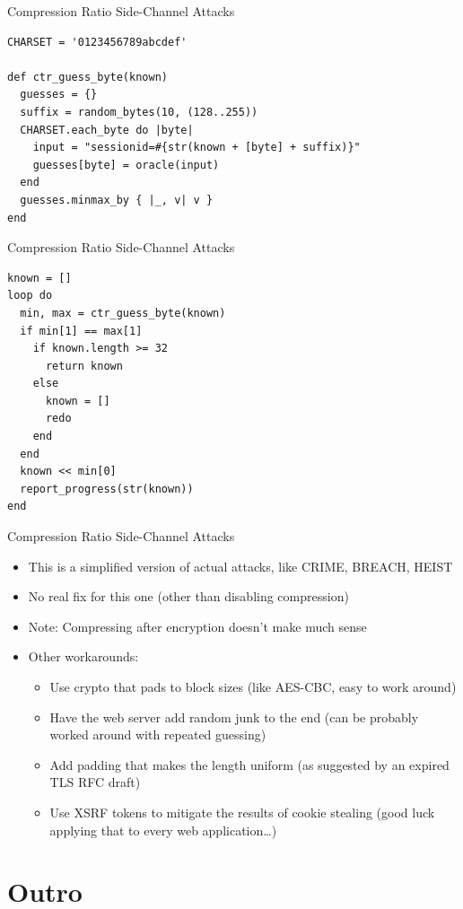 \documentclass[presentation]{beamer}
\begin{document}
\begin{frame}[fragile,label={sec:orga816509}]{Compression Ratio Side-Channel Attacks}
 \begin{verbatim}
CHARSET = '0123456789abcdef'

def ctr_guess_byte(known)
  guesses = {}
  suffix = random_bytes(10, (128..255))
  CHARSET.each_byte do |byte|
    input = "sessionid=#{str(known + [byte] + suffix)}"
    guesses[byte] = oracle(input)
  end
  guesses.minmax_by { |_, v| v }
end
\end{verbatim}
\end{frame}

\begin{frame}[fragile,label={sec:orgc72352b}]{Compression Ratio Side-Channel Attacks}
 \begin{verbatim}
known = []
loop do
  min, max = ctr_guess_byte(known)
  if min[1] == max[1]
    if known.length >= 32
      return known
    else
      known = []
      redo
    end
  end
  known << min[0]
  report_progress(str(known))
end
\end{verbatim}
\end{frame}

\begin{frame}[label={sec:org053f401}]{Compression Ratio Side-Channel Attacks}
\begin{itemize}
\item This is a simplified version of actual attacks, like CRIME, BREACH,
HEIST
\item No real fix for this one (other than disabling compression)
\item Note: Compressing after encryption doesn't make much sense
\item Other workarounds:
\begin{itemize}
\item Use crypto that pads to block sizes (like AES-CBC, easy to work
around)
\item Have the web server add random junk to the end (can be probably
worked around with repeated guessing)
\item Add padding that makes the length uniform (as suggested by an
expired TLS RFC draft)
\item Use XSRF tokens to mitigate the results of cookie stealing
(good luck applying that to every web application\ldots{})
\end{itemize}
\end{itemize}
\end{frame}

\section{Outro}
\label{sec:orgc8d47f1}
\end{document}
